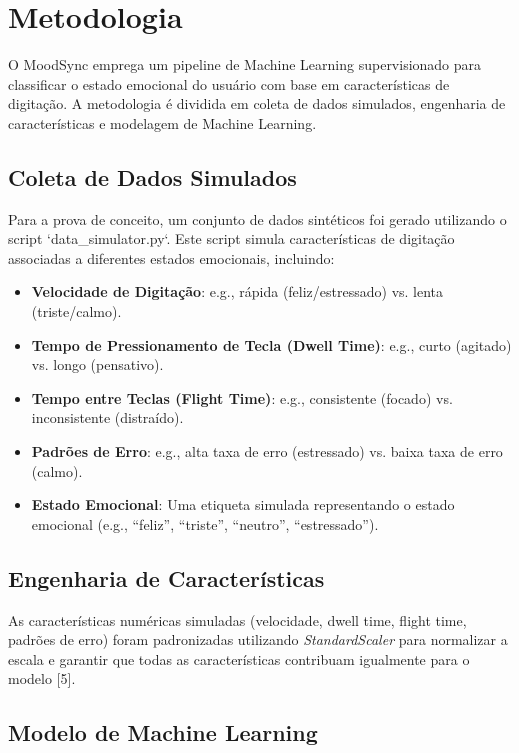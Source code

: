 \documentclass{article}
\begin{document}
\section{Metodologia}

O MoodSync emprega um pipeline de Machine Learning supervisionado para classificar o estado emocional do usuário com base em características de digitação. A metodologia é dividida em coleta de dados simulados, engenharia de características e modelagem de Machine Learning.

\subsection{Coleta de Dados Simulados}

Para a prova de conceito, um conjunto de dados sintéticos foi gerado utilizando o script `data_simulator.py`. Este script simula características de digitação associadas a diferentes estados emocionais, incluindo:
\begin{itemize}
    \item \textbf{Velocidade de Digitação}: e.g., rápida (feliz/estressado) vs. lenta (triste/calmo).
    \item \textbf{Tempo de Pressionamento de Tecla (Dwell Time)}: e.g., curto (agitado) vs. longo (pensativo).
    \item \textbf{Tempo entre Teclas (Flight Time)}: e.g., consistente (focado) vs. inconsistente (distraído).
    \item \textbf{Padrões de Erro}: e.g., alta taxa de erro (estressado) vs. baixa taxa de erro (calmo).
    \item \textbf{Estado Emocional}: Uma etiqueta simulada representando o estado emocional (e.g., ``feliz'', ``triste'', ``neutro'', ``estressado'').
\end{itemize}

\subsection{Engenharia de Características}

As características numéricas simuladas (velocidade, dwell time, flight time, padrões de erro) foram padronizadas utilizando \textit{StandardScaler} para normalizar a escala e garantir que todas as características contribuam igualmente para o modelo [5].

\subsection{Modelo de Machine Learning}
\end{document}
